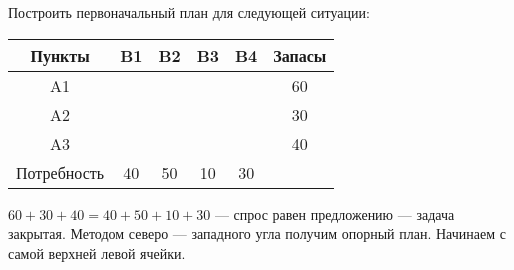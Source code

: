 \documentclass[a4paper,12pt]{article}
\begin{document}
	Построить первоначальный план для следующей ситуации:
	\begin{center}
		\begin{tabular}{|c|c|c|c|c|c|c|c|c|c}
			\hline
			Пункты & \multicolumn{2}{c|}{B1} & \multicolumn{2}{c|}{B2} & \multicolumn{2}{c|}{B3} & \multicolumn{2}{c|}{B4} & \multicolumn{1}{c|}{Запасы} \\ \hline
			\multirow{2}{*}{A1} & \multicolumn{2}{c|}{} & \multicolumn{2}{c|}{} & \multicolumn{2}{c|}{} & \multicolumn{2}{c|}{} & \multicolumn{1}{c|}{\multirow{2}{*}{60}} \\ \cline{2-9}
			&  &  &  &  &  &  &  &  & \multicolumn{1}{c|}{} \\ \hline
			\multirow{2}{*}{A2} & \multicolumn{2}{c|}{} & \multicolumn{2}{c|}{} & \multicolumn{2}{c|}{} & \multicolumn{2}{c|}{} & \multicolumn{1}{c|}{\multirow{2}{*}{30}} \\ \cline{2-9}
			&  &  &  &  &  &  &  &  & \multicolumn{1}{c|}{} \\ \hline
			\multirow{2}{*}{A3} & \multicolumn{2}{c|}{} & \multicolumn{2}{c|}{} & \multicolumn{2}{c|}{} & \multicolumn{2}{c|}{} & \multicolumn{1}{c|}{\multirow{2}{*}{40}} \\ \cline{2-9}
			&  &  &  &  &  &  &  &  & \multicolumn{1}{c|}{} \\ \hline
			Потребность & \multicolumn{2}{c|}{40} & \multicolumn{2}{c|}{50} & \multicolumn{2}{c|}{10} & \multicolumn{2}{c|}{30} &  \\ \cline{1-9}
		\end{tabular}
	\end{center}

	$60 + 30 + 40 = 40 + 50 + 10 + 30$ — спрос равен предложению — задача закрытая. Методом северо — западного угла получим опорный план. Начинаем с самой верхней левой ячейки.
	
\end{document}
